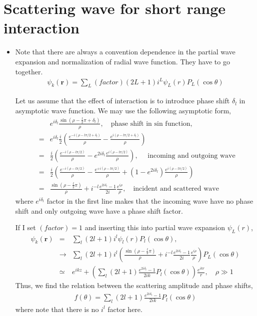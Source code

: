\documentclass[10pt]{book}
\def\bm{\boldsymbol}
\newcommand{\bea}{\begin{eqnarray}}
\newcommand{\eea}{\end{eqnarray}}
\newcommand{\no}{\nonumber \\}
\def\vr{{\bm r}}
\begin{document}
\section{Scattering wave for short range interaction} 
\begin{itemize} 

\item Note that there are always a convention dependence in the partial wave expansion and 
      normalization of radial wave function. They have to go together. 
      \bea 
      \psi_k(\vr)=\sum_L (factor) (2L+1) i^L \psi_L(r) P_L(\cos\theta) 
      \eea 
      
      Let us assume that the effect of interaction is to introduce phase shift $\delta_l$
            in asymptotic wave function.
      We may use the following asymptotic form,
      \bea 
      & &e^{i\delta_l}\frac{\sin(\rho-\frac{l}{2}\pi+\delta_l)}{\rho}, \quad
       \mbox{phase shift in sin function}, \no 
      &=&e^{i\delta_l} \frac{i}{2}\left(\frac{e^{-i(\rho-l\pi/2+\delta_l)}}{\rho}
                       -\frac{e^{i(\rho-l\pi/2+\delta_l)}}{\rho}
        \right)  \no 
      &=& \frac{i}{2}\left(\frac{e^{-i(\rho-l\pi/2)}}{\rho}
                             -e^{2i\delta_l}\frac{e^{i(\rho-l\pi/2)}}{\rho} 
              \right), \quad \mbox{ incoming and outgoing wave }  \no 
      &=& \frac{i}{2}\left(
       \frac{e^{-i(\rho-l\pi/2)}}{\rho}
                          -\frac{e^{+i(\rho-l\pi/2)}}{\rho}
                          +(1-e^{2i\delta_l})\frac{e^{i(\rho-l\pi/2)}}{\rho}
                    \right)  \no 
      &=& \frac{\sin(\rho-\frac{l}{2}\pi)}{\rho}
         +i^{-l}\frac{e^{2i\delta_l}-1}{2i}\frac{e^{i\rho}}{\rho},
         \quad \mbox{incident and scattered wave } 
      \eea 
      where $e^{i\delta_l}$ factor in the first line 
      makes that the incoming wave have no phase shift
      and only outgoing wave have a phase shift factor. 
      
      If I set $(factor)=1$ and
      inserting this into partial wave expansion $\psi_L(r)$,
      \bea 
      \psi_k(\vr)&=&\sum_l (2l+1) i^l \psi_l(r) P_l(\cos\theta),\no 
        &\to&\sum_l (2l+1) i^l \left( \frac{\sin(\rho-\frac{l}{2}\pi)}{\rho}
                 +i^{-l}\frac{e^{2i\delta_l}-1}{2i}\frac{e^{i\rho}}{\rho} \right)     
                 P_L(\cos\theta) \no 
        &\simeq& e^{i k z}
                +\left( \sum_l  (2l+1) \frac{e^{2i\delta_l}-1}{2i k}P_l(\cos\theta)\right) 
                   \frac{e^{ik r}}{r} ,\quad \rho\gg 1
      \eea 
      Thus, we find the relation between the scattering amplitude and phase shifts,
      \bea 
      f(\theta)= \sum_l  (2l+1) \frac{e^{2i\delta_l}-1}{2i k}P_l(\cos\theta)
      \eea 
      where note that there is no $i^l$ factor here.



\end{itemize}
\end{document}
